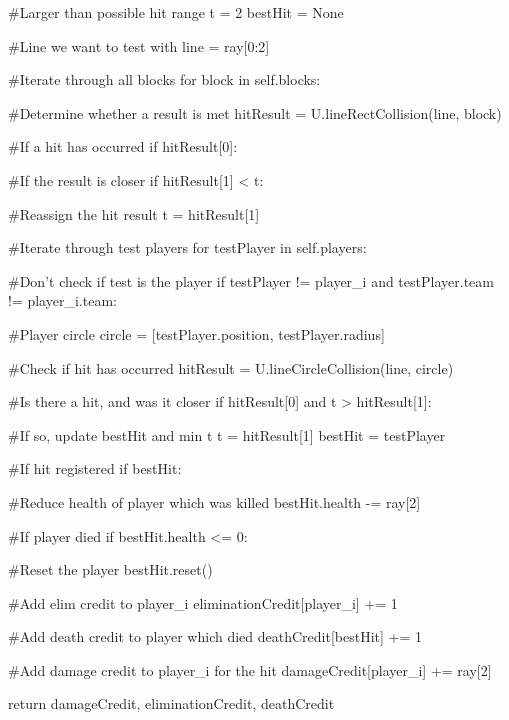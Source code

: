 \begin{mpy}
                #Larger than possible hit range
                t = 2
                bestHit = None
                
                #Line we want to test with
                line = ray[0:2]

                #Iterate through all blocks
                for block in self.blocks:

                    #Determine whether a result is met
                    hitResult = U.lineRectCollision(line, block)

                    #If a hit has occurred
                    if hitResult[0]:

                        #If the result is closer
                        if hitResult[1] < t:

                            #Reassign the hit result
                            t = hitResult[1]


                #Iterate through test players
                for testPlayer in self.players:

                    #Don't check if test is the player
                    if testPlayer != player_i and testPlayer.team != player_i.team:

                        #Player circle
                        circle = [testPlayer.position, testPlayer.radius]

                        #Check if hit has occurred
                        hitResult = U.lineCircleCollision(line, circle)

                        #Is there a hit, and was it closer
                        if hitResult[0] and t > hitResult[1]:

                            #If so, update bestHit and min t
                            t = hitResult[1]
                            bestHit = testPlayer

                #If hit registered
                if bestHit:

                    #Reduce health of player which was killed
                    bestHit.health -= ray[2]
                    
                    #If player died
                    if bestHit.health <= 0:

                        #Reset the player
                        bestHit.reset()

                        #Add elim credit to player_i
                        eliminationCredit[player_i] += 1

                        #Add death credit to player which died
                        deathCredit[bestHit] += 1

                    #Add damage credit to player_i for the hit
                    damageCredit[player_i] += ray[2]


        return damageCredit, eliminationCredit, deathCredit
\end{mpy}

